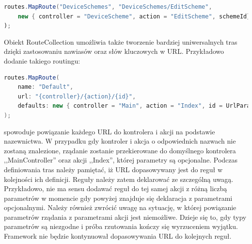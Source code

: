 \begin{lstlisting}[language=Java]
routes.MapRoute("DeviceSchemes", "DeviceSchemes/EditScheme", 
	new { controller = "DeviceScheme", action = "EditScheme", schemeId})
);
\end{lstlisting}
Obiekt RouteCollection umożliwia także tworzenie bardziej uniwersalnych tras dzięki zastosowaniu nawiasów oraz słów kluczowych w URL. Przykładowo dodanie takiego routingu:
\begin{lstlisting}[language=Java]
routes.MapRoute(
    name: "Default",
    url: "{controller}/{action}/{id}",
    defaults: new { controller = "Main", action = "Index", id = UrlParameter.Optional }
);
\end{lstlisting}
spowoduje powiązanie każdego URL do kontrolera i akcji na podstawie nazewnictwa. W przypadku gdy kontroler i akcja o odpowiednich nazwach nie zostaną znalezione, rządanie zostanie przekierowane do domyślnego kontrolera ,,MainController'' oraz akcji ,,Index'', której parametry są opcjonalne.
Podczas definiowania tras należy pamiętać, iż URL dopasowywany jest do reguł w kolejności ich definicji. Reguły należy zatem deklarować ze szczególną uwagą. Przykładowo, nie ma sensu dodawać reguł do tej samej akcji z różną liczbą parametrów w momencie gdy powyżej znajduje się deklaracja z parametrami opcjonalnymi. Należy również zwrócić uwagę na sytuację, w której powiązanie parametrów rządania z parametrami akcji jest niemożliwe. Dzieje się to, gdy typy parametrów są niezgodne i próba rzutowania kończy się wyrzuceniem wyjątku. Framework nie będzie kontynuował dopasowywania URL do kolejnych reguł.


